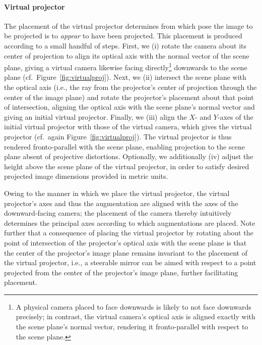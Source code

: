 \documentclass[review]{elsarticle}
\begin{document}
\paragraph{Virtual projector} The placement of the virtual projector determines from which pose the image to be projected is to \textit{appear} to have been projected. This placement is produced according to a small handful of steps. First, we (i) rotate the camera about its center of projection to align its optical axis with the normal vector of the scene plane, giving a virtual camera likewise facing directly\footnote{A physical camera placed to face downwards is likely to not face downwards precisely; in contrast, the virtual camera's optical axis is aligned exactly with the scene plane's normal vector, rendering it fronto-parallel with respect to the scene plane.} downwards to the scene plane (cf.\ Figure~\ref{fig:virtualproj}). Next, we (ii) intersect the scene plane with the optical axis (i.e., the ray from the projector's center of projection through the center of the image plane) and rotate the projector's placement about that point of intersection, aligning the optical axis with the scene plane's normal vector and giving an initial virtual projector. Finally, we (iii) align the $X$- and $Y$-axes of the initial virtual projector with those of the virtual camera, which gives the virtual projector (cf.\ again Figure~\ref{fig:virtualproj}). The virtual projector is thus rendered fronto-parallel with the scene plane, enabling projection to the scene plane absent of projective distortions. Optionally, we additionally (iv) adjust the height above the scene plane of the virtual projector, in order to satisfy desired projected image dimensions provided in metric units.

Owing to the manner in which we place the virtual projector, the virtual projector's axes and thus the augmentation are aligned with the axes of the downward-facing camera; the placement of the camera thereby intuitively determines the principal axes according to which augmentations are placed. Note further that a consequence of placing the virtual projector by rotating about the point of intersection of the projector's optical axis with the scene plane is that the center of the projector's image plane remains invariant to the placement of the virtual projector, i.e., a steerable mirror can be aimed with respect to a point projected from the center of the projector's image plane, further facilitating placement.
\end{document}
